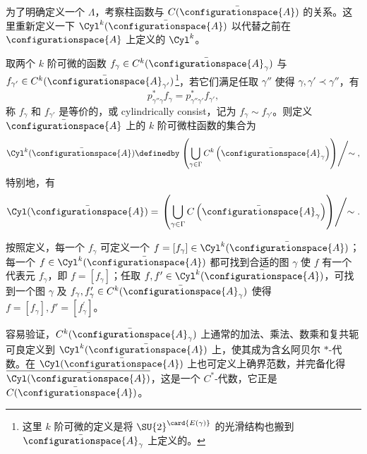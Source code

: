 			为了明确定义一个 $\Lambda$，考察柱函数与 $C(\bar{\configurationspace{A}})$ 的关系。这里重新定义一下 $\Cyl^k(\bar{\configurationspace{A}})$ 以代替之前在 $\configurationspace{A}$ 上定义的 $\Cyl^k$。
			\begin{Definition}
				取两个 $k$ 阶可微的函数 $f_\gamma \in C^k(\bar{\configurationspace{A}}_\gamma)$ 与 $f_{\gamma'} \in C^k(\bar{\configurationspace{A}}_{\gamma'})$\footnote{这里 $k$ 阶可微的定义是将 $\SU{2}^{\card{E(\gamma)}}$ 的光滑结构也搬到 $\bar{\configurationspace{A}}_\gamma$ 上定义的。}，若它们满足任取 $\gamma''$ 使得 $\gamma , \gamma' \prec \gamma''$，有
				\begin{equation}
					p^*_{\gamma'' \gamma} f_\gamma = p^*_{\gamma'' \gamma'} f_{\gamma'},
				\end{equation}
				称 $f_\gamma$ 和 $f_{\gamma'}$ 是等价的，或 cylindrically consist，记为 $f_\gamma \sim f_{\gamma'}$。则定义 $\bar{\configurationspace{A}}$ 上的 $k$ 阶可微柱函数的集合为
				\begin{equation}
					\Cyl^k(\bar{\configurationspace{A}}) \definedby \left. \left( \bigcup_{\gamma \in \Gamma} C^k \left(\bar{\configurationspace{A}}_\gamma \right) \right) \middle/ \sim \right. ,
				\end{equation}
				特别地，有
				\begin{equation}
					\Cyl(\bar{\configurationspace{A}}) = \left. \left( \bigcup_{\gamma \in \Gamma} C\left(\bar{\configurationspace{A}}_\gamma\right) \right) \middle/ \sim \right. .
				\end{equation}
			\end{Definition}
			\begin{Remark}
				按照定义，每一个 $f_\gamma$ 可定义一个 $f= [f_\gamma] \in \Cyl^k(\bar{\configurationspace{A}})$；每一个 $f\in \Cyl^k(\bar{\configurationspace{A}})$ 都可找到合适的图 $\gamma$ 使 $f$ 有一个代表元 $f_\gamma$，即 $f=[f_\gamma]$；任取 $f,f' \in \Cyl^k(\bar{\configurationspace{A}})$，可找到一个图 $\gamma$ 及 $f_\gamma, f^\prime_\gamma \in C^k(\bar{\configurationspace{A}}_\gamma)$ 使得 $f=[f_\gamma],f'=[f^\prime_\gamma]$。
			\end{Remark}
			容易验证，$C^k(\bar{\configurationspace{A}}_\gamma)$ 上通常的加法、乘法、数乘和复共轭可良定义到 $\Cyl^k(\bar{\configurationspace{A}})$ 上，使其成为含幺阿贝尔 $*$-代数。在 $\Cyl(\bar{\configurationspace{A}})$ 上也可定义上确界范数，并完备化得 $\overline{\Cyl(\bar{\configurationspace{A}})}$，这是一个 $C^*$-代数，它正是 $C(\bar{\configurationspace{A}})$\cite{Thiemann2007}。
	
